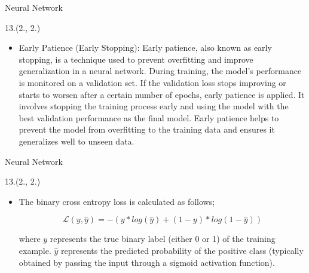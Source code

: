 \documentclass[12pt, xcolor={dvipsnames}, aspectratio = 169, sans,mathserif]{beamer}
\newenvironment{List}[2]
{\begin{textblock}{#1}#2
\begin{itemize}}
{\end{itemize}
\end{textblock}}
\begin{document}
\begin{frame}{Neural Network}

\begin{List}{13.}{(2., 2.)}

  \item Early Patience (Early Stopping): Early patience, also known as early stopping, is a technique used to prevent overfitting
  and improve generalization in a neural network. During training, the model's performance is monitored on a validation set. If the
  validation loss stops improving or starts to worsen after a certain number of epochs, early patience is applied. It involves
  stopping the training process early and using the model with the best validation performance as the final model. Early patience
  helps to prevent the model from overfitting to the training data and ensures it generalizes well to unseen data.

\end{List}

\end{frame}

\begin{frame}{Neural Network}

\begin{List}{13.}{(2., 2.)}

  \item The binary cross entropy loss is calculated as follows;

  \begin{equation*}
  \mathcal{L}(y, \hat{y}) = - (y* log(\hat{y}) + (1-y)* log(1 - \hat{y}))
  \end{equation*}

  where $y$ represents the true binary label (either 0 or 1) of the training example. $\hat{y}$ represents the predicted probability
  of the positive class (typically obtained by passing the input through a sigmoid activation function).

\end{List}

\end{frame}
\end{document}

